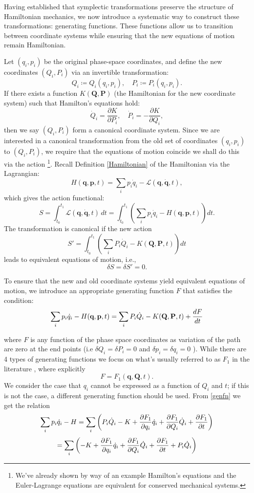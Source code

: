 \documentclass[12pt,oneside]{report}
\theoremstyle{definition}
\begin{document}
Having established that symplectic transformations preserve the structure of Hamiltonian mechanics, we now introduce a systematic way to construct these transformations: generating functions. These functions allow us to transition between coordinate systems while ensuring that the new equations of motion remain Hamiltonian.

Let $  (q_{i}, p_{i}) $ be the original phase-space coordinates, and define the new coordinates $ (Q_{i}, P_{i}) $ via an invertible transformation:
$$ Q_i \coloneqq Q_i(q_i, p_i), \quad P_i \coloneqq P_i(q_i, p_i).
$$
If there exists a function $ K(\textbf{Q}, \textbf{P}) $ (the Hamiltonian for the new coordinate system) such that Hamilton's equations hold:
$$
\dot{Q}_i = \frac{\partial K}{\partial P_i}, \quad \dot{P}_i = -\frac{\partial K}{\partial Q_i},
$$
then we say \( (Q_i, P_i) \) form a canonical coordinate system. Since we are interested in a canonical transformation from the old set of coordinates $(q_{i},p_{i})$ to $(Q_{i},P_{i})$, we require that the equations of motion coincide we shall do this via the action \footnote{We've already shown by way of an example Hamilton's equations and the Euler-Lagrange equations are equivalent for conserved mechanical systems.}. Recall Definition \ref{Hamiltonian} of the Hamiltonian via the Lagrangian:
$$
H(\textbf{q}, \textbf{p}, t) = \sum_{i} p_i \dot{q}_i - \mathcal{L}(\textbf{q}, \dot{\textbf{q}}, t),
$$
which gives the action functional:
$$
S = \int_{t_0}^{t_1} \mathcal{L}(\textbf{q}, \dot{\textbf{q}}, t) \, dt = \int_{t_0}^{t_1} \left(\sum_{i} p_i \dot{q}_i - H(\textbf{q}, \textbf{p}, t)\right) dt.
$$
The transformation is canonical if the new action
$$
S' = \int_{t_0}^{t_1} \left(\sum_{i} P_i \dot{Q}_i - K(\textbf{Q}, \textbf{P}, t)\right) dt
$$
leads to equivalent equations of motion, i.e., 
$$\delta S = \delta S' = 0.$$

To ensure that the new and old coordinate systems yield equivalent equations of motion, we introduce an appropriate generating function 
 $F$ that satisfies the condition:
\begin{equation}\label{genfn}
    \sum_{i}p_{i}\dot{q}_{i} - H(\textbf{q},\textbf{p},t) = \sum_{i}P_{i}\dot{Q}_{i} - K(\textbf{Q},\textbf{P},t) + \displaystyle\frac{d F}{d t}
\end{equation}

where $F$ is any function of the phase space coordinates as variation of the path are zero at the end points (i.e $\delta Q_{i}=\delta P_{i}=0$ and $\delta p_{i} = \delta q_{i} =0$ ). While there are 4 types of generating functions we focus on what's usually referred to as $F_{1}$ in the literature \cite{goldstein2002classical}, where explicitly
$$ F = F_{1}(\textbf{q},\textbf{Q},t).$$
We consider the case that $q_{i}$ cannot be expressed as a function of $Q_{i}$ and $t$; if this is not the case, a different generating function should be used. From \autoref{genfn} we get the relation
$$\sum_{i}p_{i}\dot{q}_{i}-H =\sum_{i} \left(P_{i}\dot{Q}_{i}-K+\displaystyle\frac{\partial F_{1}}{\partial q_{i}}\dot{q}_{i}+\displaystyle\frac{\partial F_{1}}{\partial Q_{i}}\dot{Q}_{i}+\displaystyle\frac{\partial F_{1}}{\partial t} \right)$$
$$= \sum_{i}\left(-K+\displaystyle\frac{\partial F_{1}}{\partial q_{i}}\dot{q}_{i}+\displaystyle\frac{\partial F_{1}}{\partial Q_{i}}\dot{Q}_{i}+\displaystyle\frac{\partial F_{1}}{\partial t}+{P}_{i}\dot{Q}_{i} \right)$$
\end{document}
